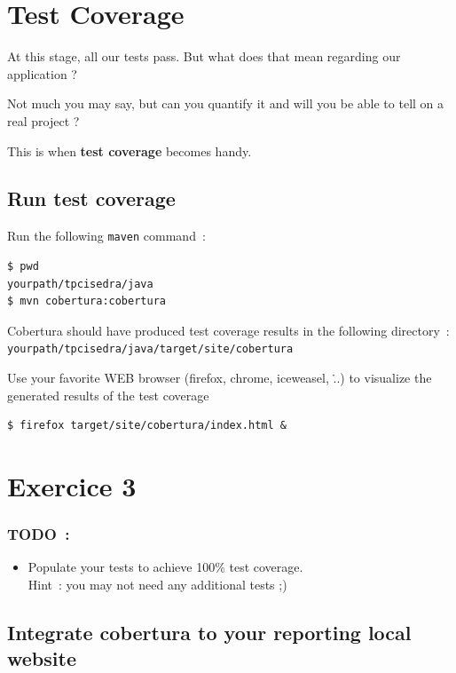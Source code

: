 \documentclass{article}
\begin{document}
\section{Test Coverage}

At this stage, all our tests pass. But what does that mean regarding our application ?

Not much you may say, but can you quantify it and will you be able to tell on a real project ?

This is when \textbf{test coverage} becomes handy.

\subsection{Run test coverage}

Run the following \texttt{maven} command~:
\begin{lstlisting}
$ pwd
yourpath/tpcisedra/java
$ mvn cobertura:cobertura
\end{lstlisting}

Cobertura should have produced test coverage results in the following directory~:\\
\texttt{yourpath/tpcisedra/java/target/site/cobertura}


Use your favorite WEB browser (firefox, chrome, iceweasel, \...) to visualize the generated results of the test coverage
\begin{lstlisting}
$ firefox target/site/cobertura/index.html &
\end{lstlisting}

\section{Exercice 3}

\subsubsection{TODO~:}

\begin{itemize}
\item Populate your tests to achieve 100\% test coverage.\\
Hint~: you may not need any additional tests ;)
\end{itemize}


\subsection{Integrate cobertura to your reporting local website}
\end{document}
